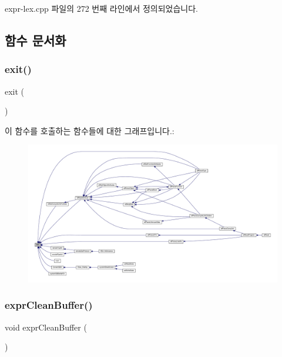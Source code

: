 expr-\/lex.\+cpp 파일의 272 번째 라인에서 정의되었습니다.



\subsection{함수 문서화}
\mbox{\label{expr-lex_8cpp_a6d2c3c030982c7aa276480da4522ae0f}} 
\subsubsection{\texorpdfstring{exit()}{exit()}}
{\footnotesize\ttfamily exit (\begin{DoxyParamCaption}\item[{\mbox{\hyperlink{expr-lex_8cpp_ae93e67b85c44f6bd31ead14a552a35c8}{Y\+Y\+\_\+\+E\+X\+I\+T\+\_\+\+F\+A\+I\+L\+U\+RE}}}]{ }\end{DoxyParamCaption})}

이 함수를 호출하는 함수들에 대한 그래프입니다.\+:
\nopagebreak
\begin{figure}[H]
\begin{center}
\leavevmode
\includegraphics[width=350pt]{expr-lex_8cpp_a6d2c3c030982c7aa276480da4522ae0f_icgraph}
\end{center}
\end{figure}
\mbox{\label{expr-lex_8cpp_a656fdf035cf4adb57d73e9cc5377d1b5}} 
\subsubsection{\texorpdfstring{expr\+Clean\+Buffer()}{exprCleanBuffer()}}
{\footnotesize\ttfamily void expr\+Clean\+Buffer (\begin{DoxyParamCaption}{ }\end{DoxyParamCaption})}



